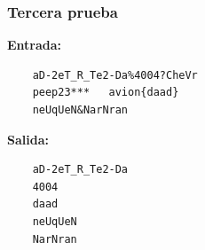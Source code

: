 \documentclass[a4paper, 10pt]{article}
\newcommand\tab[1][0.5cm]{\hspace*{#1}}
\begin{document}
			\subsubsection{Tercera prueba}
				\textbf{Entrada:}
				\begin{lstlisting}
    aD-2eT_R_Te2-Da%4004?CheVr
    peep23***   avion{daad}
    neUqUeN&NarNran
		        	\end{lstlisting}
				\tab\textbf{Salida:}
				\begin{lstlisting}
    aD-2eT_R_Te2-Da
    4004
    daad
    neUqUeN
    NarNran	
		        	\end{lstlisting}
\end{document}
